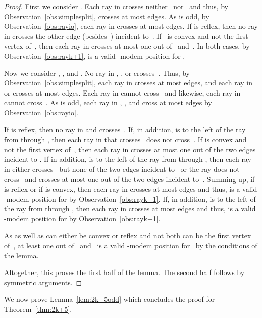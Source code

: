 \documentclass[A4]{article}
\begin{document}
\begin{proof}
First we consider .
Each ray in  crosses neither~ nor~ and thus, by Observation~\ref{obs:simplesplit}, crosses at most  edges.
As  is odd, by Observation~\ref{obs:rayio}, each ray in  crosses at most  edges.
If  is reflex, then no ray in  crosses the other edge (besides~) incident to~.
If~ is convex and not the first vertex of~, then each ray in  crosses at most one out of~ and~.
In both cases, by Observation~\ref{obs:rayk+1},  is a valid \mbox{-modem} position for .



Now we consider , , and .
No ray in , , or  crosses~.
Thus, by Observation~\ref{obs:simplesplit}, each ray in  crosses at most  edges, and each ray in  or  crosses at most  edges.
Each ray in  cannot cross~ and likewise, each ray in  cannot cross~.
As  is odd, each ray in , , and  cross at most  edges by Observation~\ref{obs:rayio}.



If  is reflex, then no ray in  and  crosses~.
If, in addition,  is to the left of the ray from  through , then each ray in  that crosses~ does not cross~.
If  is convex and not the first vertex of~, then each ray in  crosses at most one out of the two edges incident to .
If in addition,  is to the left of the ray from  through , then each ray in  either crosses~ but none of the two edges incident to~ or the ray does not cross~ and crosses at most one out of the two edges incident to~.
Summing up, if  is reflex or if  is convex, then each ray in  crosses at most  edges and thus,  is a valid \mbox{-modem} position for  by Observation~\ref{obs:rayk+1}.
If, in addition,  is to the left of the ray from  through , then each ray in  crosses at most  edges and thus,  is a valid \mbox{-modem} position for  by Observation~\ref{obs:rayk+1}.



As  as well as  can either be convex or reflex and not both can be the first vertex of~, at least one out of~ and~ is a valid \mbox{-modem} position for~ by the conditions of the lemma.


\smallskip

Altogether, this proves the first half of the lemma. The second half follows by symmetric arguments.  
\end{proof}

We now prove Lemma~\ref{lem:2k+5odd} which concludes the proof for Theorem~\ref{thm:2k+5}.
\end{document}
